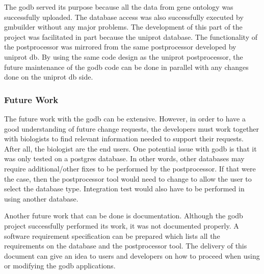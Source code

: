 The godb served its purpose because all the data from gene ontology was successfully uploaded.  The database access was also
successfully executed by gmbuilder without any major problems.  The development of this part of the project was facilitated
in part because the uniprot database.  The functionality of the postprocessor was mirrored from the same postprocessor
developed by uniprot db.  By using the same code design as the uniprot postprocessor, the future maintenance of the godb
code can be done in parallel with any changes done on the uniprot db side.

\subsubsection{Future Work}
The future work with the godb can be extensive.  However, in order to have a good understanding of
future change requests, the developers must work together with biologists to find relevant information needed to support their requests.
After all, the biologist are the end users. One potential issue with  godb is that it was only tested on a postgres database. In other
words, other databases may require additional/other fixes to be performed by the postprocessor. If that were the case, then
the postprocessor tool would need to change to allow the user to select the database type. Integration test would also have to be performed
in using another database.

Another future work that can be done is
documentation.  Although the godb project successfully performed its work, it was not documented properly.  A software
requirement specification can be prepared which lists all the requirements on the database and the postprocessor tool.  The
delivery of this document can give an idea to users and developers on how to proceed when using or modifying the godb
applications.

%
